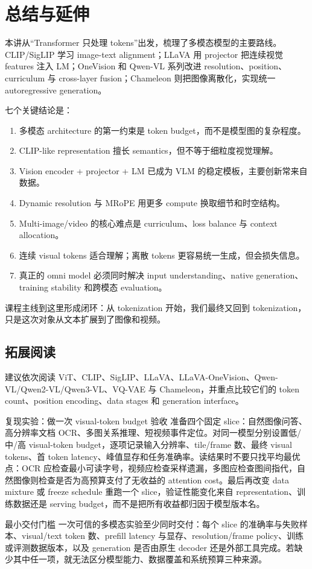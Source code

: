 \section{总结与延伸}

本讲从“Transformer 只处理 tokens”出发，梳理了多模态模型的主要路线。CLIP/SigLIP 学习 image-text alignment；LLaVA 用 projector 把连续视觉 features 注入 LM；OneVision 和 Qwen-VL 系列改进 resolution、position、curriculum 与 cross-layer fusion；Chameleon 则把图像离散化，实现统一 autoregressive generation。

七个关键结论是：

\begin{enumerate}
\item 多模态 architecture 的第一约束是 token budget，而不是模型图的复杂程度。
\item CLIP-like representation 擅长 semantics，但不等于细粒度视觉理解。
\item Vision encoder + projector + LM 已成为 VLM 的稳定模板，主要创新常来自数据。
\item Dynamic resolution 与 MRoPE 用更多 compute 换取细节和时空结构。
\item Multi-image/video 的核心难点是 curriculum、loss balance 与 context allocation。
\item 连续 visual tokens 适合理解；离散 tokens 更容易统一生成，但会损失信息。
\item 真正的 omni model 必须同时解决 input understanding、native generation、training stability 和跨模态 evaluation。
\end{enumerate}

课程主线到这里形成闭环：从 tokenization 开始，我们最终又回到 tokenization，只是这次对象从文本扩展到了图像和视频。

\subsection{拓展阅读}

建议依次阅读 ViT、CLIP、SigLIP、LLaVA、LLaVA-OneVision、Qwen-VL/Qwen2-VL/Qwen3-VL、VQ-VAE 与 Chameleon，并重点比较它们的 token count、position encoding、data stages 和 generation interface。

\begin{knowledgebox}{复现实验：做一次 visual-token budget 验收}
准备四个固定 slice：自然图像问答、高分辨率文档 OCR、多图关系推理、短视频事件定位。对同一模型分别设置低/中/高 visual-token budget，逐项记录输入分辨率、tile/frame 数、最终 visual tokens、首 token latency、峰值显存和任务准确率。读结果时不要只找平均最优点：OCR 应检查最小可读字号，视频应检查采样遗漏，多图应检查图间指代，自然图像则检查是否为高预算支付了无收益的 attention cost。最后再改变 data mixture 或 freeze schedule 重跑一个 slice，验证性能变化来自 representation、训练数据还是 serving budget，而不是把所有收益都归因于模型版本名。
\end{knowledgebox}

\begin{importantbox}{最小交付门槛}
一次可信的多模态实验至少同时交付：每个 slice 的准确率与失败样本、visual/text token 数、prefill latency 与显存、resolution/frame policy、训练或评测数据版本，以及 generation 是否由原生 decoder 还是外部工具完成。若缺少其中任一项，就无法区分模型能力、数据覆盖和系统预算三种来源。
\end{importantbox}


